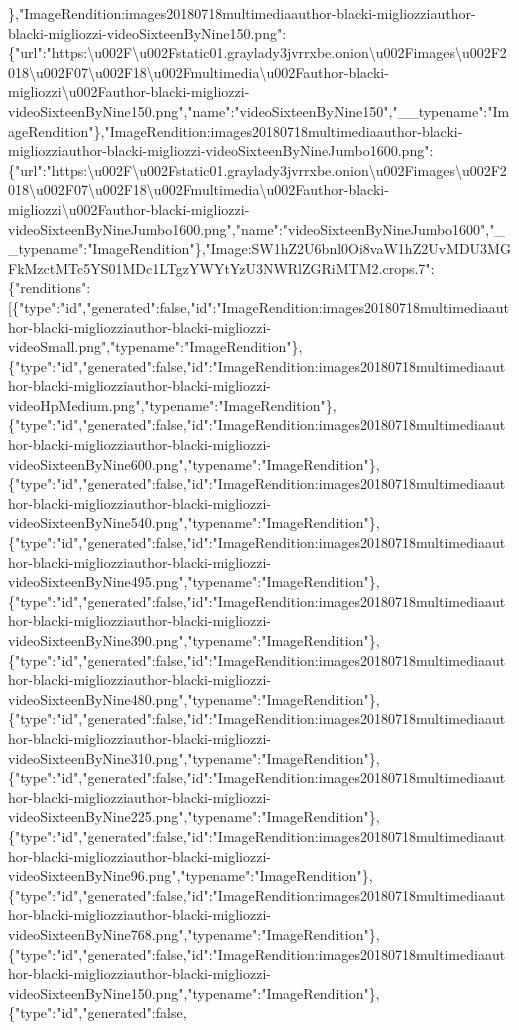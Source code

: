 \},"ImageRendition:images20180718multimediaauthor-blacki-migliozziauthor-blacki-migliozzi-videoSixteenByNine150.png":\{"url":"https:\textbackslash{}u002F\textbackslash{}u002Fstatic01.graylady3jvrrxbe.onion\textbackslash{}u002Fimages\textbackslash{}u002F2018\textbackslash{}u002F07\textbackslash{}u002F18\textbackslash{}u002Fmultimedia\textbackslash{}u002Fauthor-blacki-migliozzi\textbackslash{}u002Fauthor-blacki-migliozzi-videoSixteenByNine150.png","name":"videoSixteenByNine150","\_\_typename":"ImageRendition"\},"ImageRendition:images20180718multimediaauthor-blacki-migliozziauthor-blacki-migliozzi-videoSixteenByNineJumbo1600.png":\{"url":"https:\textbackslash{}u002F\textbackslash{}u002Fstatic01.graylady3jvrrxbe.onion\textbackslash{}u002Fimages\textbackslash{}u002F2018\textbackslash{}u002F07\textbackslash{}u002F18\textbackslash{}u002Fmultimedia\textbackslash{}u002Fauthor-blacki-migliozzi\textbackslash{}u002Fauthor-blacki-migliozzi-videoSixteenByNineJumbo1600.png","name":"videoSixteenByNineJumbo1600","\_\_typename":"ImageRendition"\},"Image:SW1hZ2U6bnl0Oi8vaW1hZ2UvMDU3MGFkMzctMTc5YS01MDc1LTgzYWYtYzU3NWRlZGRiMTM2.crops.7":\{"renditions":{[}\{"type":"id","generated":false,"id":"ImageRendition:images20180718multimediaauthor-blacki-migliozziauthor-blacki-migliozzi-videoSmall.png","typename":"ImageRendition"\},\{"type":"id","generated":false,"id":"ImageRendition:images20180718multimediaauthor-blacki-migliozziauthor-blacki-migliozzi-videoHpMedium.png","typename":"ImageRendition"\},\{"type":"id","generated":false,"id":"ImageRendition:images20180718multimediaauthor-blacki-migliozziauthor-blacki-migliozzi-videoSixteenByNine600.png","typename":"ImageRendition"\},\{"type":"id","generated":false,"id":"ImageRendition:images20180718multimediaauthor-blacki-migliozziauthor-blacki-migliozzi-videoSixteenByNine540.png","typename":"ImageRendition"\},\{"type":"id","generated":false,"id":"ImageRendition:images20180718multimediaauthor-blacki-migliozziauthor-blacki-migliozzi-videoSixteenByNine495.png","typename":"ImageRendition"\},\{"type":"id","generated":false,"id":"ImageRendition:images20180718multimediaauthor-blacki-migliozziauthor-blacki-migliozzi-videoSixteenByNine390.png","typename":"ImageRendition"\},\{"type":"id","generated":false,"id":"ImageRendition:images20180718multimediaauthor-blacki-migliozziauthor-blacki-migliozzi-videoSixteenByNine480.png","typename":"ImageRendition"\},\{"type":"id","generated":false,"id":"ImageRendition:images20180718multimediaauthor-blacki-migliozziauthor-blacki-migliozzi-videoSixteenByNine310.png","typename":"ImageRendition"\},\{"type":"id","generated":false,"id":"ImageRendition:images20180718multimediaauthor-blacki-migliozziauthor-blacki-migliozzi-videoSixteenByNine225.png","typename":"ImageRendition"\},\{"type":"id","generated":false,"id":"ImageRendition:images20180718multimediaauthor-blacki-migliozziauthor-blacki-migliozzi-videoSixteenByNine96.png","typename":"ImageRendition"\},\{"type":"id","generated":false,"id":"ImageRendition:images20180718multimediaauthor-blacki-migliozziauthor-blacki-migliozzi-videoSixteenByNine768.png","typename":"ImageRendition"\},\{"type":"id","generated":false,"id":"ImageRendition:images20180718multimediaauthor-blacki-migliozziauthor-blacki-migliozzi-videoSixteenByNine150.png","typename":"ImageRendition"\},\{"type":"id","generated":false,